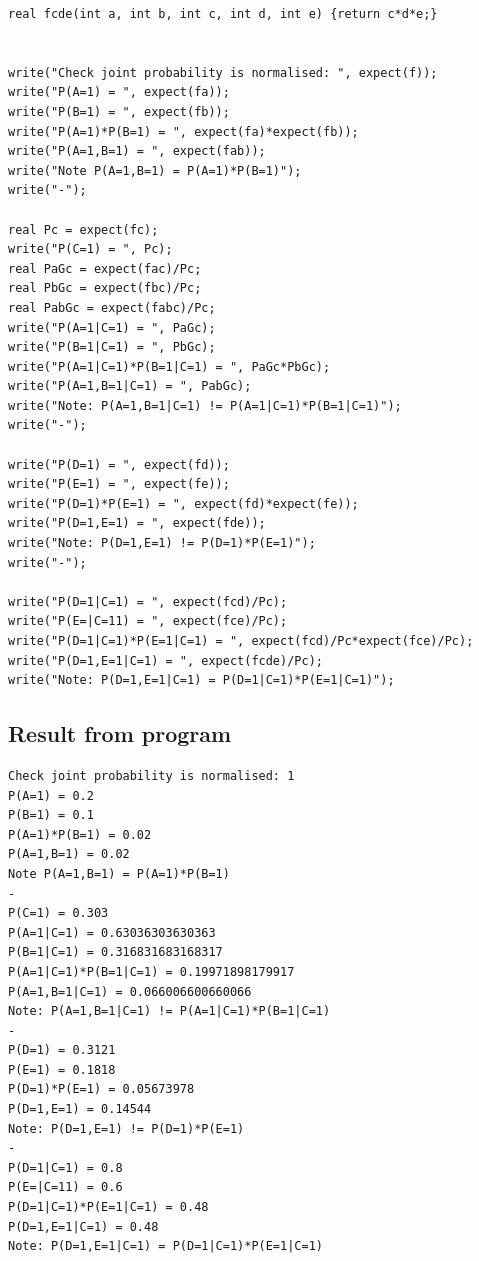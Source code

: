 \documentclass[11pt]{article}
\begin{document}
\begin{verbatim}
real fcde(int a, int b, int c, int d, int e) {return c*d*e;}


write("Check joint probability is normalised: ", expect(f));
write("P(A=1) = ", expect(fa));
write("P(B=1) = ", expect(fb));
write("P(A=1)*P(B=1) = ", expect(fa)*expect(fb));
write("P(A=1,B=1) = ", expect(fab));
write("Note P(A=1,B=1) = P(A=1)*P(B=1)");
write("-");

real Pc = expect(fc);
write("P(C=1) = ", Pc);
real PaGc = expect(fac)/Pc;
real PbGc = expect(fbc)/Pc;
real PabGc = expect(fabc)/Pc;
write("P(A=1|C=1) = ", PaGc);
write("P(B=1|C=1) = ", PbGc);
write("P(A=1|C=1)*P(B=1|C=1) = ", PaGc*PbGc);
write("P(A=1,B=1|C=1) = ", PabGc);
write("Note: P(A=1,B=1|C=1) != P(A=1|C=1)*P(B=1|C=1)");
write("-");

write("P(D=1) = ", expect(fd));
write("P(E=1) = ", expect(fe));
write("P(D=1)*P(E=1) = ", expect(fd)*expect(fe));
write("P(D=1,E=1) = ", expect(fde));
write("Note: P(D=1,E=1) != P(D=1)*P(E=1)");
write("-");

write("P(D=1|C=1) = ", expect(fcd)/Pc);
write("P(E=|C=11) = ", expect(fce)/Pc);
write("P(D=1|C=1)*P(E=1|C=1) = ", expect(fcd)/Pc*expect(fce)/Pc);
write("P(D=1,E=1|C=1) = ", expect(fcde)/Pc);
write("Note: P(D=1,E=1|C=1) = P(D=1|C=1)*P(E=1|C=1)");
\end{verbatim}

\subsection{Result from program}
\label{sec:org9f9791a}
\begin{verbatim}
Check joint probability is normalised: 1
P(A=1) = 0.2
P(B=1) = 0.1
P(A=1)*P(B=1) = 0.02
P(A=1,B=1) = 0.02
Note P(A=1,B=1) = P(A=1)*P(B=1)
-
P(C=1) = 0.303
P(A=1|C=1) = 0.63036303630363
P(B=1|C=1) = 0.316831683168317
P(A=1|C=1)*P(B=1|C=1) = 0.19971898179917
P(A=1,B=1|C=1) = 0.066006600660066
Note: P(A=1,B=1|C=1) != P(A=1|C=1)*P(B=1|C=1)
-
P(D=1) = 0.3121
P(E=1) = 0.1818
P(D=1)*P(E=1) = 0.05673978
P(D=1,E=1) = 0.14544
Note: P(D=1,E=1) != P(D=1)*P(E=1)
-
P(D=1|C=1) = 0.8
P(E=|C=11) = 0.6
P(D=1|C=1)*P(E=1|C=1) = 0.48
P(D=1,E=1|C=1) = 0.48
Note: P(D=1,E=1|C=1) = P(D=1|C=1)*P(E=1|C=1)
\end{verbatim}
\end{document}

